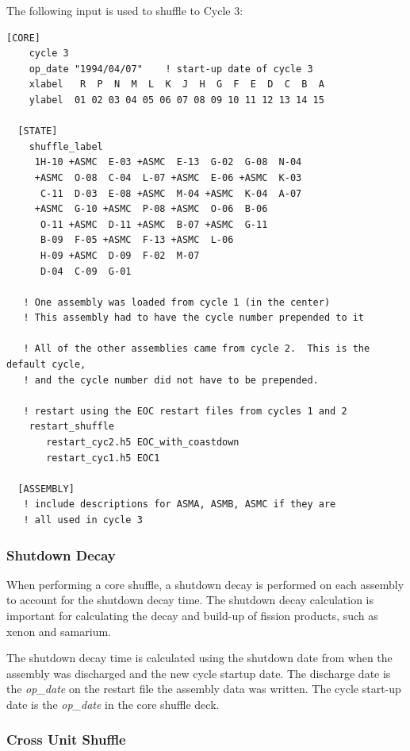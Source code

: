 The following input is used to shuffle to Cycle 3:
\begin{Verbatim}[fontsize=\small]
  [CORE]
    cycle 3
    op_date "1994/04/07"    ! start-up date of cycle 3
    xlabel   R  P  N  M  L  K  J  H  G  F  E  D  C  B  A
    ylabel  01 02 03 04 05 06 07 08 09 10 11 12 13 14 15

  [STATE]
    shuffle_label
     1H-10 +ASMC  E-03 +ASMC  E-13  G-02  G-08  N-04
     +ASMC  O-08  C-04  L-07 +ASMC  E-06 +ASMC  K-03
      C-11  D-03  E-08 +ASMC  M-04 +ASMC  K-04  A-07
     +ASMC  G-10 +ASMC  P-08 +ASMC  O-06  B-06
      O-11 +ASMC  D-11 +ASMC  B-07 +ASMC  G-11
      B-09  F-05 +ASMC  F-13 +ASMC  L-06
      H-09 +ASMC  D-09  F-02  M-07
      D-04  C-09  G-01

   ! One assembly was loaded from cycle 1 (in the center)
   ! This assembly had to have the cycle number prepended to it

   ! All of the other assemblies came from cycle 2.  This is the default cycle,
   ! and the cycle number did not have to be prepended.

   ! restart using the EOC restart files from cycles 1 and 2
    restart_shuffle
       restart_cyc2.h5 EOC_with_coastdown
       restart_cyc1.h5 EOC1

  [ASSEMBLY]
   ! include descriptions for ASMA, ASMB, ASMC if they are
   ! all used in cycle 3
\end{Verbatim}

\subsubsection{Shutdown Decay}
When performing a core shuffle, a shutdown decay is performed on each assembly to account for
the shutdown decay time.  The shutdown decay calculation is important for calculating the decay and
build-up of fission products, such as xenon and samarium.

The shutdown decay time is calculated using the shutdown date from when the assembly was discharged
and the new cycle startup date.  The discharge date is the {\it op\_date} on the restart file
the assembly data was written.
The cycle start-up date is the {\it op\_date} in the core shuffle deck.

\subsubsection{Cross Unit Shuffle}

